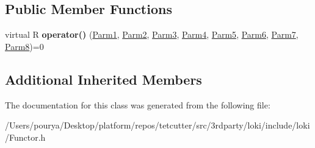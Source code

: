 \subsection*{Public Member Functions}
\begin{DoxyCompactItemize}
\item 
\hypertarget{classLoki_1_1FunctorImpl_3_01R_00_01Seq_3_01P1_00_01P2_00_01P3_00_01P4_00_01P5_00_01P6_00_01P7_06c19e0651c71b6e2b0b1938538813ae6_af7d4ef83af26cc09b59f82ceae595e3e}{}virtual R {\bfseries operator()} (\hyperlink{classLoki_1_1EmptyType}{Parm1}, \hyperlink{classLoki_1_1EmptyType}{Parm2}, \hyperlink{classLoki_1_1EmptyType}{Parm3}, \hyperlink{classLoki_1_1EmptyType}{Parm4}, \hyperlink{classLoki_1_1EmptyType}{Parm5}, \hyperlink{classLoki_1_1EmptyType}{Parm6}, \hyperlink{classLoki_1_1EmptyType}{Parm7}, \hyperlink{classLoki_1_1EmptyType}{Parm8})=0\label{classLoki_1_1FunctorImpl_3_01R_00_01Seq_3_01P1_00_01P2_00_01P3_00_01P4_00_01P5_00_01P6_00_01P7_06c19e0651c71b6e2b0b1938538813ae6_af7d4ef83af26cc09b59f82ceae595e3e}

\end{DoxyCompactItemize}
\subsection*{Additional Inherited Members}


The documentation for this class was generated from the following file\+:\begin{DoxyCompactItemize}
\item 
/\+Users/pourya/\+Desktop/platform/repos/tetcutter/src/3rdparty/loki/include/loki/Functor.\+h\end{DoxyCompactItemize}
